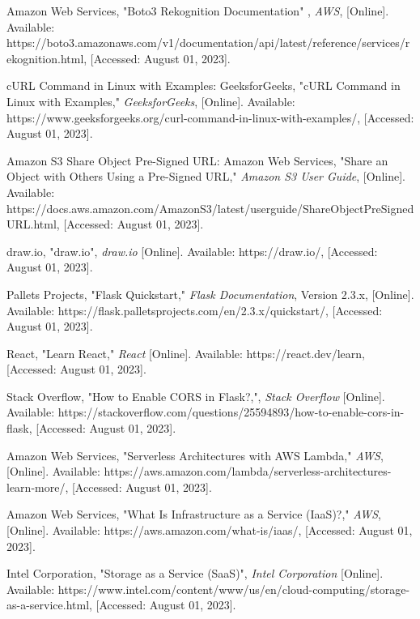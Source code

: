 \begin{sloppypar}
\begin{enumerate}[label={[\arabic*]}]
    \item Amazon Web Services, "Boto3 Rekognition Documentation" , \textit{AWS}, [Online]. Available: https://boto3.amazonaws.com/v1/documentation/api/latest/reference/services/rekognition.html, [Accessed: August 01, 2023].

    \item cURL Command in Linux with Examples:
GeeksforGeeks, "cURL Command in Linux with Examples," \textit{GeeksforGeeks}, [Online]. Available: https://www.geeksforgeeks.org/curl-command-in-linux-with-examples/, [Accessed: August 01, 2023].

    \item Amazon S3 Share Object Pre-Signed URL:
Amazon Web Services, "Share an Object with Others Using a Pre-Signed URL," \textit{Amazon S3 User Guide}, [Online]. Available: https://docs.aws.amazon.com/AmazonS3/latest/userguide/ShareObjectPreSignedURL.html, [Accessed: August 01, 2023].

    \item draw.io, "draw.io", \textit{draw.io} [Online]. Available: https://draw.io/, [Accessed: August 01, 2023].

    \item Pallets Projects, "Flask Quickstart," \textit{Flask Documentation}, Version 2.3.x, [Online]. Available: https://flask.palletsprojects.com/en/2.3.x/quickstart/, [Accessed: August 01, 2023].

    \item React, "Learn React," \textit{React }[Online]. Available: https://react.dev/learn, [Accessed: August 01, 2023].

    \item Stack Overflow, "How to Enable CORS in Flask?,", \textit{Stack Overflow} [Online]. Available: https://stackoverflow.com/questions/25594893/how-to-enable-cors-in-flask, [Accessed: August 01, 2023].

    \item Amazon Web Services, "Serverless Architectures with AWS Lambda," \textit{AWS}, [Online]. Available: https://aws.amazon.com/lambda/serverless-architectures-learn-more/, [Accessed: August 01, 2023].

    \item Amazon Web Services, "What Is Infrastructure as a Service (IaaS)?," \textit{AWS}, [Online]. Available: https://aws.amazon.com/what-is/iaas/, [Accessed: August 01, 2023].

    \item Intel Corporation, "Storage as a Service (SaaS)",  \textit{Intel Corporation} [Online]. Available: https://www.intel.com/content/www/us/en/cloud-computing/storage-as-a-service.html, [Accessed: August 01, 2023].


\end{enumerate}
\end{sloppypar}
